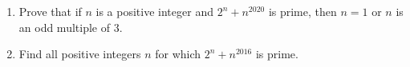 \begin{enumerate}
\item[(a)] Prove that if $n$ is a positive integer and $2^n+n^{2020}$ is prime, then $n=1$ or $n$ is an odd multiple of $3$.
\item[(b)] Find all positive integers $n$ for which $2^n+n^{2016}$ is prime.
\end{enumerate}

